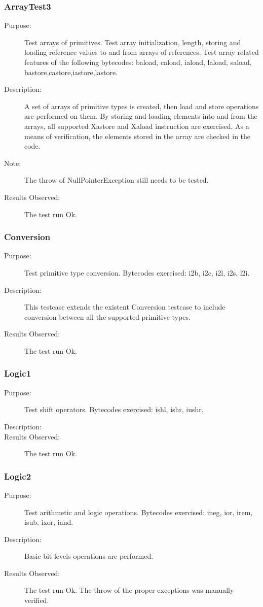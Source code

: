 \subsubsection{ArrayTest3}
\begin{description}
   \item[Purpose:]
Test arrays of primitives. Test array initialization, length,
storing and loading reference values to and from arrays of
references. Test array related features of the following bytecodes:
baload, caload, iaload, laload, saload,
bastore,castore,iastore,lastore.
   \item[Description:]
A set of arrays of primitive types is created, then load and store
operations are performed on them. By storing and loading elements
into and from the arrays, all supported Xastore and Xaload
instruction are exercised. As a means of verification, the elements
stored in the array are checked in the code.
  \item[Note:]
The throw of NullPointerException still needs to be tested.
   \item[Results Observed:]
The test run Ok.
\end{description}

\subsubsection{Conversion}
\begin{description}
   \item[Purpose:]
Test primitive type conversion. Bytecodes exercised: i2b, i2c, i2l,
i2s, l2i.
   \item[Description:]
This testcase extends the existent Conversion testcase to include
conversion between all the supported primitive types.
   \item[Results Observed:]
The test run Ok.
\end{description}


\subsubsection{Logic1}
\begin{description}
   \item[Purpose:]
Test shift operators. Bytecodes exercised: ishl, ishr, iushr.
   \item[Description:]
   \item[Results Observed:]
The test run Ok.
\end{description}


\subsubsection{Logic2}
\begin{description}
   \item[Purpose:]
Test arithmetic and logic operations. Bytecodes exercised: ineg,
ior, irem, isub, ixor, iand.
   \item[Description:]
Basic bit levels operations are performed.
   \item[Results Observed:]
The test run Ok. The throw of the proper exceptions was manually
verified.
\end{description}


